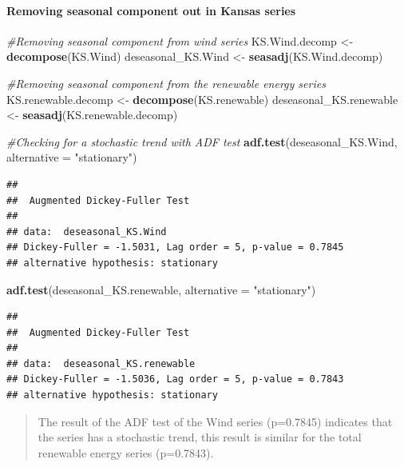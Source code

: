 \documentclass[12pt,]{article}
\newenvironment{Shaded}{\begin{snugshade}}{\end{snugshade}}
\newcommand{\KeywordTok}[1]{\textcolor[rgb]{0.13,0.29,0.53}{\textbf{#1}}}
\newcommand{\DataTypeTok}[1]{\textcolor[rgb]{0.13,0.29,0.53}{#1}}
\newcommand{\StringTok}[1]{\textcolor[rgb]{0.31,0.60,0.02}{#1}}
\newcommand{\CommentTok}[1]{\textcolor[rgb]{0.56,0.35,0.01}{\textit{#1}}}
\newcommand{\NormalTok}[1]{#1}
\let\oldparagraph\paragraph
\renewcommand{\paragraph}[1]{\oldparagraph{#1}\mbox{}}
\begin{document}
\paragraph{Removing seasonal component out in Kansas
series}\label{removing-seasonal-component-out-in-kansas-series}

\begin{Shaded}
\begin{Highlighting}[]
\CommentTok{#Removing seasonal component from wind series}
\NormalTok{KS.Wind.decomp <-}\StringTok{ }\KeywordTok{decompose}\NormalTok{(KS.Wind)}
\NormalTok{deseasonal_KS.Wind <-}\StringTok{ }\KeywordTok{seasadj}\NormalTok{(KS.Wind.decomp)}

\CommentTok{#Removing seasonal component from the renewable energy series}
\NormalTok{KS.renewable.decomp <-}\StringTok{ }\KeywordTok{decompose}\NormalTok{(KS.renewable)}
\NormalTok{deseasonal_KS.renewable <-}\StringTok{ }\KeywordTok{seasadj}\NormalTok{(KS.renewable.decomp)}

\CommentTok{#Checking for a stochastic trend with ADF test}
\KeywordTok{adf.test}\NormalTok{(deseasonal_KS.Wind, }\DataTypeTok{alternative =} \StringTok{"stationary"}\NormalTok{)}
\end{Highlighting}
\end{Shaded}

\begin{verbatim}
## 
##  Augmented Dickey-Fuller Test
## 
## data:  deseasonal_KS.Wind
## Dickey-Fuller = -1.5031, Lag order = 5, p-value = 0.7845
## alternative hypothesis: stationary
\end{verbatim}

\begin{Shaded}
\begin{Highlighting}[]
\KeywordTok{adf.test}\NormalTok{(deseasonal_KS.renewable, }\DataTypeTok{alternative =} \StringTok{"stationary"}\NormalTok{)}
\end{Highlighting}
\end{Shaded}

\begin{verbatim}
## 
##  Augmented Dickey-Fuller Test
## 
## data:  deseasonal_KS.renewable
## Dickey-Fuller = -1.5036, Lag order = 5, p-value = 0.7843
## alternative hypothesis: stationary
\end{verbatim}

\begin{quote}
The result of the ADF test of the Wind series (p=0.7845) indicates that
the series has a stochastic trend, this result is similar for the total
renewable energy series (p=0.7843).
\end{quote}
\end{document}
